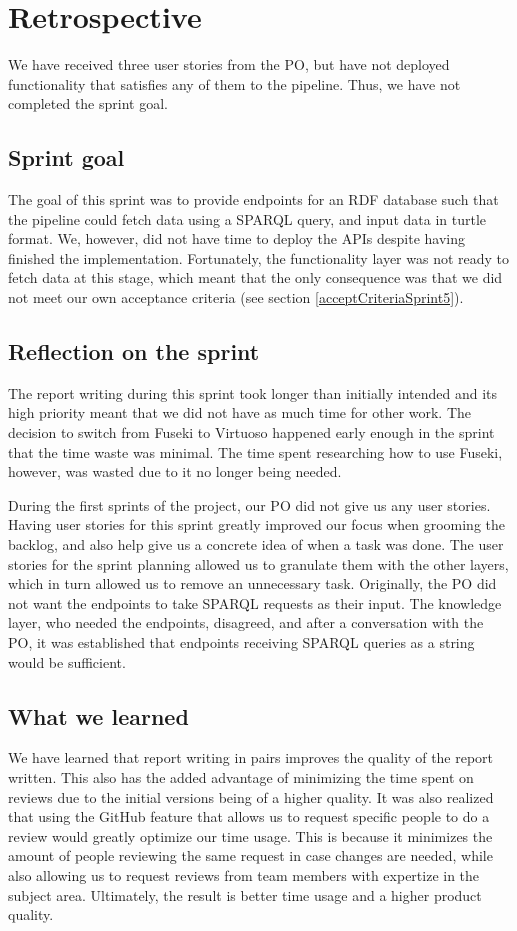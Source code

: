 \section{Retrospective}
We have received three user stories from the PO, but have not deployed functionality that satisfies any of them to the \knox{} pipeline. Thus, we have not completed the sprint goal.

\subsection{Sprint goal}
The goal of this sprint was to provide endpoints for an RDF database such that the \knox{} pipeline could fetch data using a SPARQL query, and input data in turtle format. We, however, did not have time to deploy the APIs despite having finished the implementation. Fortunately, the functionality layer was not ready to fetch data at this stage, which meant that the only consequence was that we did not meet our own acceptance criteria (see section \ref{acceptCriteriaSprint5}).

\subsection{Reflection on the sprint}
The report writing during this sprint took longer than initially intended and its high priority meant that we did not have as much time for other work.
The decision to switch from Fuseki to Virtuoso happened early enough in the sprint that the time waste was minimal. The time spent researching how to use Fuseki, however, was wasted due to it no longer being needed.

During the first sprints of the project, our PO did not give us any user stories. Having user stories for this sprint greatly improved our focus when grooming the backlog, and also help give us a concrete idea of when a task was done. 
The user stories for the sprint planning allowed us to granulate them with the other layers, which in turn allowed us to remove an unnecessary task. Originally, the PO did not want the endpoints to take SPARQL requests as their input.
The knowledge layer, who needed the endpoints, disagreed, and after a conversation with the PO, it was established that endpoints receiving SPARQL queries as a string would be sufficient.

\subsection{What we learned}
We have learned that report writing in pairs improves the quality of the report written. This also has the added advantage of minimizing the time spent on reviews due to the initial versions being of a higher quality.
It was also realized that using the GitHub feature that allows us to request specific people to do a review would greatly optimize our time usage. 
This is because it minimizes the amount of people reviewing the same request in case changes are needed, while also allowing us to request reviews from team members with expertize in the subject area.
Ultimately, the result is better time usage and a higher product quality. 

